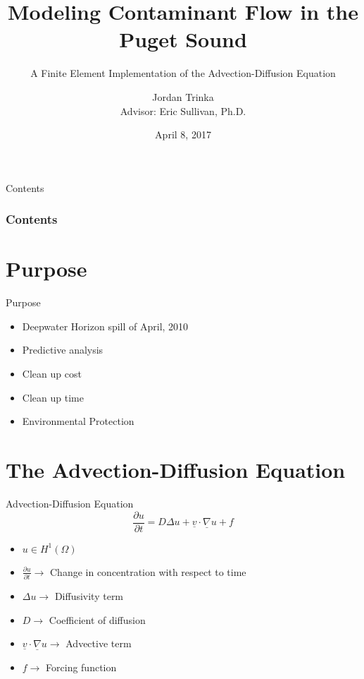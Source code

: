 \documentclass[10pt]{beamer}
\author{Jordan Trinka\\ Advisor: Eric Sullivan, Ph.D.}
\title[Short Title]{ Modeling Contaminant Flow in the \\Puget Sound}
\subtitle{A Finite Element Implementation of the Advection-Diffusion Equation} %
\date{April 8, 2017} %
\begin{document}
\begin{frame}[t,plain]
    \titlepage
\end{frame}

\begin{frame}{Contents}
\frametitle{Contents}
    \tableofcontents[
]
\end{frame}

\section{Purpose}

\begin{frame}{Purpose}
\begin{itemize}
\item Deepwater Horizon spill of April, 2010
\item Predictive analysis
\item Clean up cost
\item Clean up time
\item Environmental Protection
\end{itemize}
\end{frame}

\section{The Advection-Diffusion Equation}
\begin{frame}{Advection-Diffusion Equation}
\begin{equation}
\frac{\partial u}{\partial t}= D\Delta u + \underline{v} \cdot \underline{\nabla}u+f
\end{equation}
\begin{itemize}
\item $u \in  H^{1}\left(\Omega \right)$
\item $\frac{\partial u}{\partial t} \rightarrow$ Change in concentration with respect to time
\item $\Delta u \rightarrow$ Diffusivity term
\item $D \rightarrow$ Coefficient of diffusion
\item $\underline{v} \cdot \underline{\nabla}u \rightarrow$ Advective term
\item $f \rightarrow$ Forcing function 
\end{itemize}
\end{frame}
\end{document}
